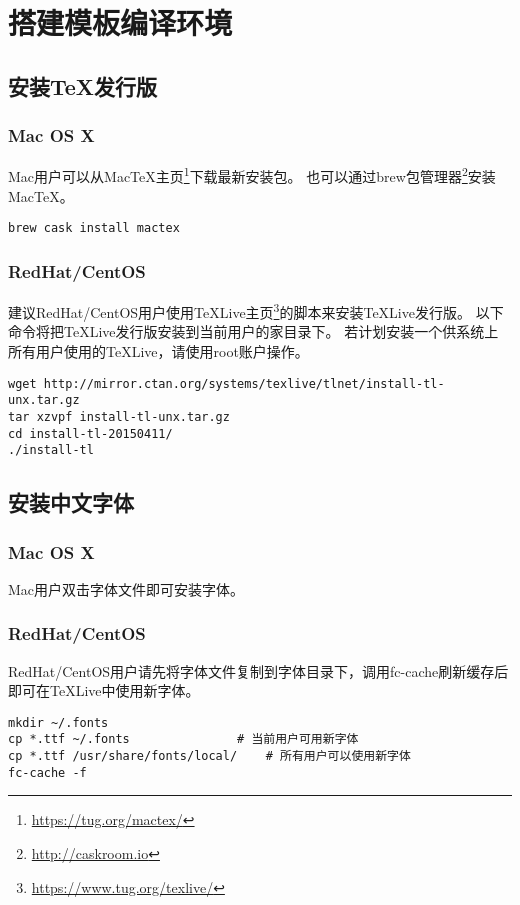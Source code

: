 \chapter{搭建模板编译环境}

\section{安装TeX发行版}

\subsection{Mac OS X}

Mac用户可以从MacTeX主页\footnote{\url{https://tug.org/mactex/}}下载最新安装包。
也可以通过brew包管理器\footnote{\url{http://caskroom.io}}安装MacTeX。

\begin{lstlisting}[basicstyle=\small\ttfamily, numbers=none]
brew cask install mactex
\end{lstlisting}

\subsection{RedHat/CentOS}

建议RedHat/CentOS用户使用TeXLive主页\footnote{\url{https://www.tug.org/texlive/}}的脚本来安装TeXLive发行版。
以下命令将把TeXLive发行版安装到当前用户的家目录下。
若计划安装一个供系统上所有用户使用的TeXLive，请使用root账户操作。

\begin{lstlisting}[basicstyle=\small\ttfamily, numbers=none]
wget http://mirror.ctan.org/systems/texlive/tlnet/install-tl-unx.tar.gz
tar xzvpf install-tl-unx.tar.gz
cd install-tl-20150411/
./install-tl
\end{lstlisting}

\section{安装中文字体}

\subsection{Mac OS X}

Mac用户双击字体文件即可安装字体。

\subsection{RedHat/CentOS}

RedHat/CentOS用户请先将字体文件复制到字体目录下，调用fc-cache刷新缓存后即可在TeXLive中使用新字体。

\begin{lstlisting}[basicstyle=\small\ttfamily, numbers=none]
mkdir ~/.fonts
cp *.ttf ~/.fonts				# 当前用户可用新字体
cp *.ttf /usr/share/fonts/local/	# 所有用户可以使用新字体
fc-cache -f
\end{lstlisting}

